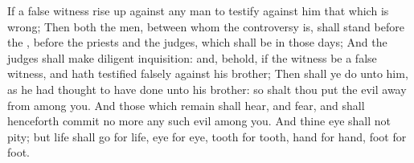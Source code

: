 \begin{biblechapter}
\verse If a false witness rise up against any man to testify against him that which is wrong;
\verse Then both the men, between whom the controversy is, shall stand before the \LORD, before the priests and the judges, which shall be in those days;
\verse And the judges shall make diligent inquisition: and, behold, if the witness be a false witness, and hath testified falsely against his brother;
\verse Then shall ye do unto him, as he had thought to have done unto his brother: so shalt thou put the evil away from among you.
\verse And those which remain shall hear, and fear, and shall henceforth commit no more any such evil among you.
\verse And thine eye shall not pity; but life shall go for life, eye for eye, tooth for tooth, hand for hand, foot for foot.
\end{biblechapter}

